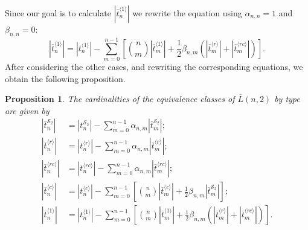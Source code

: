 \documentclass[a4paper]{article}
\newtheorem{prop}{Proposition}
\begin{document}
Since our goal is to calculate $|\overline{t}^{\langle 1 \rangle}_n|$ we
rewrite the equation using $\alpha_{n,n} = 1$ and $\beta_{n,n} = 0$:
\[
|\overline{t}_n^{\langle 1 \rangle}| =  |t_n^{\langle 1 \rangle}|
        - \sum_{m=0}^{n-1} \left[ \binom{n}{m} |\overline{t}_m^{\langle 1 \rangle}|
        + \frac{1}{2} \beta_{n,m}  \left( |\overline{t}_m^{\langle r \rangle}|
        + |\overline{t}_m^{\langle rc \rangle}| \right) \right].
\]
After considering the other cases, and rewriting the corresponding equations, we obtain the following proposition.
\begin{prop}
The cardinalities of the equivalence classes of $\overline{L}(n,2)$ by type are given by
\begin{equation*}
  \label{eq:t}
  \begin{aligned}
|\overline{t}_n^{\mathcal{S}_2}| &= |t_n^{\mathcal{S}_2}| - \sum_{m=0}^{n-1} \alpha_{n,m} |\overline{t}_m^{\mathcal{S}_2}|; \\
|\overline{t}_n^{\langle r \rangle}| &= |t_n^{\langle r \rangle}|
        - \sum_{m=0}^{n-1} \alpha_{n,m} |\overline{t}_m^{\langle r \rangle}|; \\
|\overline{t}_n^{\langle rc \rangle}| &= |t_n^{\langle rc \rangle}|
        - \sum_{m=0}^{n-1} \alpha_{n,m} |\overline{t}_m^{\langle rc \rangle}|; \\
|\overline{t}_n^{\langle c \rangle}| &= |t_n^{\langle c \rangle}|
        - \sum_{m=0}^{n-1} \left[ \binom{n}{m} |\overline{t}_m^{\langle c \rangle}|
        + \frac{1}{2} \beta_{n,m} |\overline{t}_m^{\mathcal{S}_2}| \right]; \\
|\overline{t}_n^{\langle 1 \rangle}| &=  |t_n^{\langle 1 \rangle}|
        - \sum_{m=0}^{n-1} \left[ \binom{n}{m} |\overline{t}_m^{\langle 1 \rangle}|
        + \frac{1}{2} \beta_{n,m}  \left( |\overline{t}_m^{\langle r \rangle}|
        + |\overline{t}_m^{\langle rc \rangle}| \right) \right].
  \end{aligned}
\end{equation*}
\end{prop}
\end{document}
